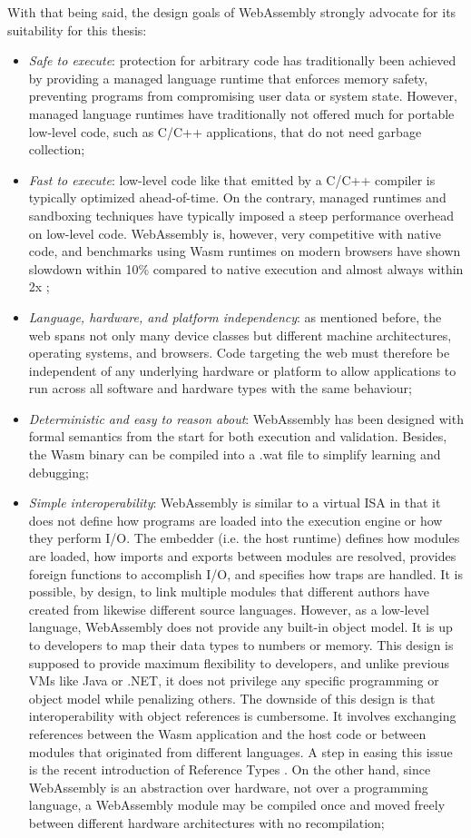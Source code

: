 With that being said, the design goals of WebAssembly strongly advocate for its suitability for this thesis:

\begin{itemize}
    \item \emph{Safe to execute}: protection for arbitrary code has traditionally been achieved by providing a managed language runtime that enforces memory safety, preventing programs from compromising user data or system state. However, managed language runtimes have traditionally not offered much for portable low-level code, such as C/C++ applications, that do not need garbage collection;
    \item \emph{Fast to execute}: low-level code like that emitted by a C/C++ compiler is typically optimized ahead-of-time. On the contrary, managed runtimes and sandboxing techniques have typically imposed a steep performance overhead on low-level code. WebAssembly is, however, very competitive with native code, and benchmarks using Wasm runtimes on modern browsers have shown slowdown within 10\% compared to native execution and almost always within 2x \cite{wasm};
    \item \emph{Language, hardware, and platform independency}: as mentioned before, the web spans not only many device classes but different machine architectures, operating systems, and browsers. Code targeting the web must therefore be independent of any underlying hardware or platform to allow applications to run across all software and hardware types with the same behaviour;
    \item \emph{Deterministic and easy to reason about}: WebAssembly has been designed with formal semantics from the start for both execution and validation. Besides, the Wasm binary can be compiled into a .wat file to simplify learning and debugging;
    \item \emph{Simple interoperability}: WebAssembly is similar to a virtual ISA in that it does not define how programs are loaded into the execution engine or how they perform I/O. The embedder (i.e. the host runtime) defines how modules are loaded, how imports and exports between modules are resolved, provides foreign functions to accomplish I/O, and specifies how traps are handled. It is possible, by design, to link multiple modules that different authors have created from likewise different source languages. However, as a low-level language, WebAssembly does not provide any built-in object model. It is up to developers to map their data types to numbers or memory. This design is supposed to provide maximum flexibility to developers, and unlike previous VMs like Java or .NET, it does not privilege any specific programming or object model while penalizing others. The downside of this design is that interoperability with object references is cumbersome. It involves exchanging references between the Wasm application and the host code or between modules that originated from different languages. A step in easing this issue is the recent introduction of Reference Types \cite{reference-types}. On the other hand, since WebAssembly is an abstraction over hardware, not over a programming language, a WebAssembly module may be compiled once and moved freely between different hardware architectures with no recompilation;

\end{itemize}
